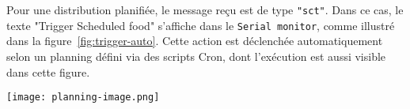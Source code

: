 Pour une distribution planifiée, le message reçu est de type \verb|"sct"|. Dans ce cas, le texte "Trigger Scheduled food" s'affiche dans le \verb|Serial monitor|, comme illustré dans la figure~\ref{fig:trigger-auto}. Cette action est déclenchée automatiquement selon un planning défini via des scripts Cron, dont l'exécution est aussi visible dans cette figure.\\

\begin{minipage}{\linewidth}
\centering
\texttt{[image: planning-image.png]}
\label{fig:trigger-auto}
\end{minipage}


